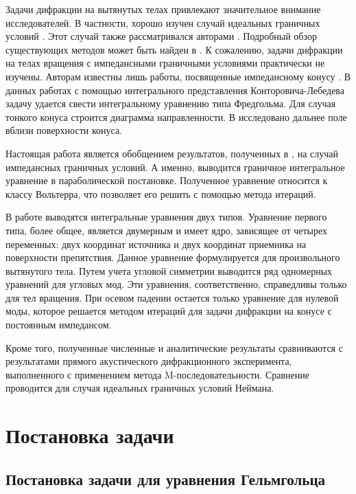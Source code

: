 Задачи дифракции на вытянутых телах привлекают значительное внимание исследователей. В частности, хорошо изучен случай идеальных граничных условий \cite{Andronov2011, Andronov2012, Andronov2012_2, Kirpichnikova2013, Popov2014, Engineer1998, Smyshlyaev1990, Felsen1957}. Этот случай также рассматривался авторами \cite{Shanin2011, Shanin2017}. Подробный обзор существующих методов может быть найден в \cite{Shanin2017}. К сожалению, задачи дифракции на телах вращения с импедансными граничными условиями практически не изучены. Авторам известны лишь работы, посвященные импедансному конусу \cite{Lyalinov2003, Bernard2004, Antipov2003}. В данных работах с помощью интегрального представления Конторовича-Лебедева задачу удается свести интегральному уравнению типа Фредгольма. Для случая тонкого конуса строится диаграмма направленности. В \cite{Lyalinov2009} исследовано дальнее поле вблизи поверхности конуса.

Настоящая работа является обобщением результатов, полученных в \cite{Shanin2017}, на случай импедансных граничных условий. А именно, выводится граничное интегральное уравнение в параболической постановке. Полученное уравнение относится к классу Вольтерра, что позволяет его решить с помощью метода итераций.

В работе выводятся интегральные уравнения двух типов. Уравнение первого типа, более общее, является двумерным и имеет ядро, зависящее от четырех переменных: двух координат источника и двух координат приемника на поверхности препятствия. Данное уравнение формулируется для произвольного вытянутого тела. Путем учета угловой симметрии выводится ряд одномерных уравнений для угловых мод. Эти уравнения, соответственно, справедливы только для тел вращения. При осевом падении остается только уравнение для нулевой моды, которое решается методом итераций для задачи дифракции на конусе с постоянным импедансом.

Кроме того, полученные численные и аналитические результаты сравниваются с результатами прямого акустического дифракционного эксперимента, выполненного с применением метода M-последовательности. Сравнение проводится для случая идеальных граничных условий Неймана.

\section{Постановка задачи}

\subsection{Постановка задачи для уравнения Гельмгольца}

